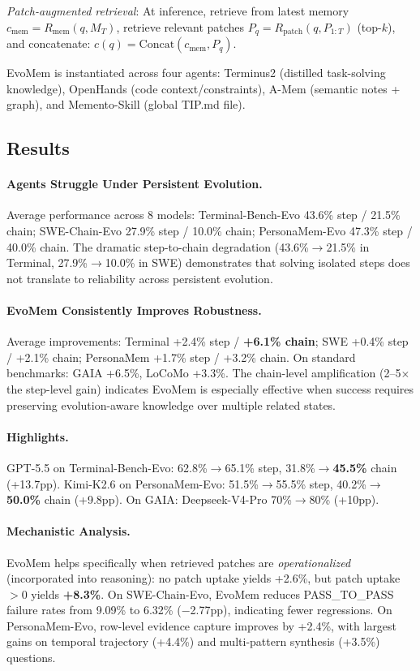 \documentclass[11pt,a4paper]{article}
\begin{document}
\emph{Patch-augmented retrieval}: At inference, retrieve from latest memory $c_{\mathrm{mem}} = R_{\mathrm{mem}}(q, M_T)$, retrieve relevant patches $P_q = R_{\mathrm{patch}}(q, P_{1:T})$ (top-$k$), and concatenate: $c(q) = \mathrm{Concat}(c_{\mathrm{mem}}, P_q)$.

EvoMem is instantiated across four agents: Terminus2 (distilled task-solving knowledge), OpenHands (code context/constraints), A-Mem (semantic notes + graph), and Memento-Skill (global TIP.md file).

\subsection{Results}

\paragraph{Agents Struggle Under Persistent Evolution.} Average performance across 8 models: Terminal-Bench-Evo 43.6\% step / 21.5\% chain; SWE-Chain-Evo 27.9\% step / 10.0\% chain; PersonaMem-Evo 47.3\% step / 40.0\% chain. The dramatic step-to-chain degradation (43.6\%$\to$21.5\% in Terminal, 27.9\%$\to$10.0\% in SWE) demonstrates that solving isolated steps does not translate to reliability across persistent evolution.

\paragraph{EvoMem Consistently Improves Robustness.} Average improvements: Terminal +2.4\% step / \textbf{+6.1\% chain}; SWE +0.4\% step / +2.1\% chain; PersonaMem +1.7\% step / +3.2\% chain. On standard benchmarks: GAIA +6.5\%, LoCoMo +3.3\%. The chain-level amplification (2--5$\times$ the step-level gain) indicates EvoMem is especially effective when success requires preserving evolution-aware knowledge over multiple related states.

\paragraph{Highlights.} GPT-5.5 on Terminal-Bench-Evo: 62.8\%$\to$65.1\% step, 31.8\%$\to$\textbf{45.5\%} chain (+13.7pp). Kimi-K2.6 on PersonaMem-Evo: 51.5\%$\to$55.5\% step, 40.2\%$\to$\textbf{50.0\%} chain (+9.8pp). On GAIA: Deepseek-V4-Pro 70\%$\to$80\% (+10pp).

\paragraph{Mechanistic Analysis.} EvoMem helps specifically when retrieved patches are \emph{operationalized} (incorporated into reasoning): no patch uptake yields +2.6\%, but patch uptake $>0$ yields \textbf{+8.3\%}. On SWE-Chain-Evo, EvoMem reduces PASS\_TO\_PASS failure rates from 9.09\% to 6.32\% ($-$2.77pp), indicating fewer regressions. On PersonaMem-Evo, row-level evidence capture improves by +2.4\%, with largest gains on temporal trajectory (+4.4\%) and multi-pattern synthesis (+3.5\%) questions.
\end{document}
